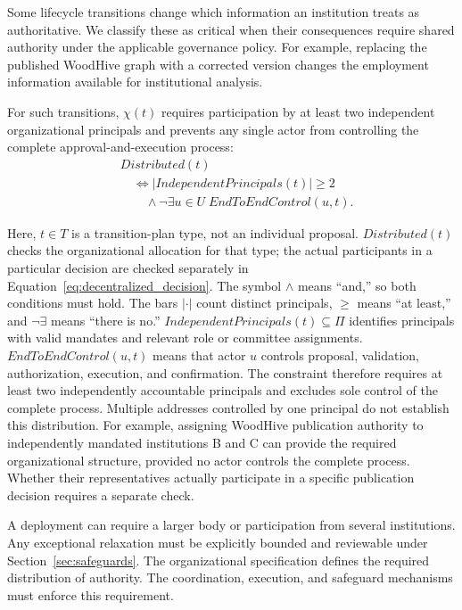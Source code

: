 \documentclass[journal]{IEEEtran}
\begin{document}
Some lifecycle transitions change which information an
institution treats as authoritative. We classify these as
critical when their consequences require shared authority
under the applicable governance policy. For example,
replacing the published WoodHive graph with a corrected
version changes the employment information available for
institutional analysis.

For such transitions, $\chi(t)$ requires participation by
at least two independent organizational principals and
prevents any single actor from controlling the complete
approval-and-execution process:
\begin{equation}
\label{eq:distributed_transition}
\begin{aligned}
&Distributed(t)\\
&\quad\iff |IndependentPrincipals(t)|\geq 2\\
&\qquad\land\neg\exists u\in U\;EndToEndControl(u,t).
\end{aligned}
\end{equation}

Here, $t\in T$ is a transition-plan type, not an individual
proposal. $Distributed(t)$ checks the organizational allocation
for that type; the actual participants in a particular decision
are checked separately in Equation~\ref{eq:decentralized_decision}.
The symbol $\land$ means ``and,'' so both conditions must hold.
The bars $|\cdot|$ count distinct principals, $\geq$ means
``at least,'' and $\neg\exists$ means ``there is no.''
$IndependentPrincipals(t)\subseteq\Pi$ identifies principals
with valid mandates and relevant role or committee assignments.
$EndToEndControl(u,t)$ means that actor $u$ controls proposal,
validation, authorization, execution, and confirmation.
The constraint therefore requires at least two independently
accountable principals and excludes sole control of the
complete process. Multiple addresses controlled by one principal
do not establish this distribution.
For example, assigning WoodHive publication authority to independently
mandated institutions B and C can provide the required organizational
structure, provided no actor controls the complete process.
Whether their representatives actually participate in a specific
publication decision requires a separate check.

A deployment can require a larger body or participation from
several institutions. Any exceptional relaxation must be
explicitly bounded and reviewable under
Section~\ref{sec:safeguards}. The organizational specification defines the required
distribution of authority. The coordination, execution,
and safeguard mechanisms must enforce this requirement.
\end{document}
